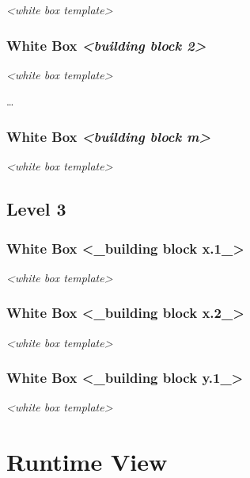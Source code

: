 \emph{\textless{}white box template\textgreater{}}

\subsubsection{\texorpdfstring{White Box \emph{\textless{}building block
2\textgreater{}}}{White Box \textless{}building block 2\textgreater{}}}\label{_white_box_emphasis_building_block_2_emphasis}

\emph{\textless{}white box template\textgreater{}}

\ldots{}

\subsubsection{\texorpdfstring{White Box \emph{\textless{}building block
m\textgreater{}}}{White Box \textless{}building block m\textgreater{}}}\label{_white_box_emphasis_building_block_m_emphasis}

\emph{\textless{}white box template\textgreater{}}

\subsection{Level 3}\label{_level_3}

\subsubsection{White Box \textless{}\_building block
x.1\_\textgreater{}}\label{_white_box_building_block_x_1}

\emph{\textless{}white box template\textgreater{}}

\subsubsection{White Box \textless{}\_building block
x.2\_\textgreater{}}\label{_white_box_building_block_x_2}

\emph{\textless{}white box template\textgreater{}}

\subsubsection{White Box \textless{}\_building block
y.1\_\textgreater{}}\label{_white_box_building_block_y_1}

\emph{\textless{}white box template\textgreater{}}

\section{Runtime View}\label{section-runtime-view}

